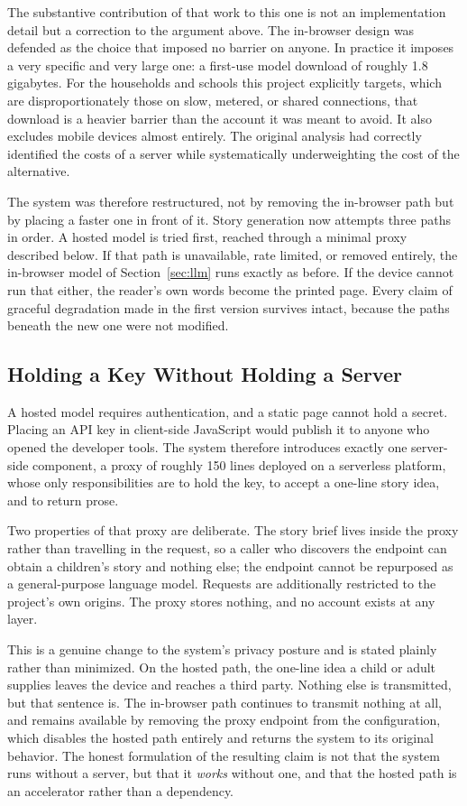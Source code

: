 \documentclass[conference]{IEEEtran}
\begin{document}
The substantive contribution of that work to this one is not an implementation detail but a correction to the argument above. The in-browser design was defended as the choice that imposed no barrier on anyone. In practice it imposes a very specific and very large one: a first-use model download of roughly 1.8 gigabytes. For the households and schools this project explicitly targets, which are disproportionately those on slow, metered, or shared connections, that download is a heavier barrier than the account it was meant to avoid. It also excludes mobile devices almost entirely. The original analysis had correctly identified the costs of a server while systematically underweighting the cost of the alternative.

The system was therefore restructured, not by removing the in-browser path but by placing a faster one in front of it. Story generation now attempts three paths in order. A hosted model is tried first, reached through a minimal proxy described below. If that path is unavailable, rate limited, or removed entirely, the in-browser model of Section~\ref{sec:llm} runs exactly as before. If the device cannot run that either, the reader's own words become the printed page. Every claim of graceful degradation made in the first version survives intact, because the paths beneath the new one were not modified.

\subsection{Holding a Key Without Holding a Server}

A hosted model requires authentication, and a static page cannot hold a secret. Placing an API key in client-side JavaScript would publish it to anyone who opened the developer tools. The system therefore introduces exactly one server-side component, a proxy of roughly 150 lines deployed on a serverless platform, whose only responsibilities are to hold the key, to accept a one-line story idea, and to return prose.

Two properties of that proxy are deliberate. The story brief lives inside the proxy rather than travelling in the request, so a caller who discovers the endpoint can obtain a children's story and nothing else; the endpoint cannot be repurposed as a general-purpose language model. Requests are additionally restricted to the project's own origins. The proxy stores nothing, and no account exists at any layer.

This is a genuine change to the system's privacy posture and is stated plainly rather than minimized. On the hosted path, the one-line idea a child or adult supplies leaves the device and reaches a third party. Nothing else is transmitted, but that sentence is. The in-browser path continues to transmit nothing at all, and remains available by removing the proxy endpoint from the configuration, which disables the hosted path entirely and returns the system to its original behavior. The honest formulation of the resulting claim is not that the system runs without a server, but that it \emph{works} without one, and that the hosted path is an accelerator rather than a dependency.
\end{document}
